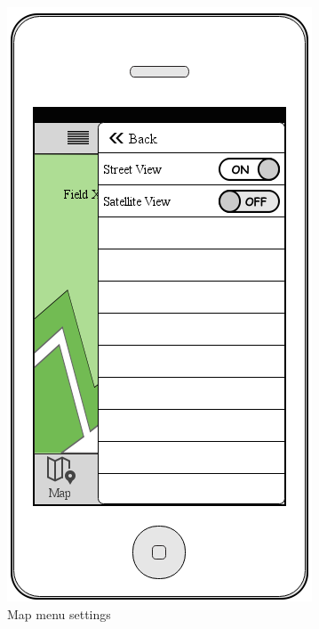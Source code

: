 \documentclass[12pt]{article}
\begin{document}
\begin{figure}[ht]
	\includegraphics[width=\linewidth, height=0.4\textheight, keepaspectratio=true]{mockups/MapMenuMapSettings.png}
	\caption{Map menu settings}
	\endminipage\hfill
\end{figure}
\end{document}
